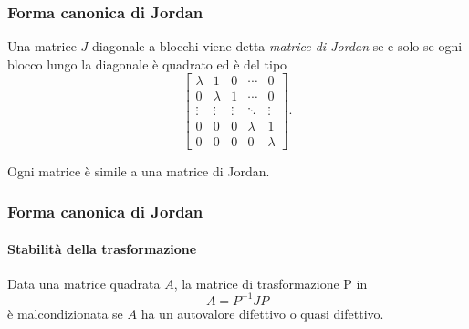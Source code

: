\begin{frame}
	\frametitle{Forma canonica di Jordan}
		\begin{definition}
			Una matrice $J$ diagonale a blocchi viene detta \emph{matrice di Jordan} se e solo se
			ogni blocco lungo la diagonale \`e quadrato ed \`e del tipo
			\[
				\begin{bmatrix}
					\lambda     &    1         &    0     &   \cdots   &    0    \\
						0       &    \lambda   &    1     &   \cdots   &    0    \\
					\vdots      &    \vdots    &  \vdots  &   \ddots   & \vdots  \\
						0       &       0      &     0    &  \lambda   &    1    \\
						0       &       0      &     0    &     0      & \lambda
				\end{bmatrix}.
			\]
		\end{definition}
		 Ogni matrice \`e simile a una matrice di Jordan.
\end{frame}


\begin{frame}
	\frametitle{Forma canonica di Jordan}
	\framesubtitle{Stabilit\`a della trasformazione}
	Data una matrice quadrata $A$, la matrice di trasformazione P in
	\[A = P^{-1}JP\]
	\`e malcondizionata se $A$ ha un autovalore difettivo o quasi difettivo.
\end{frame}